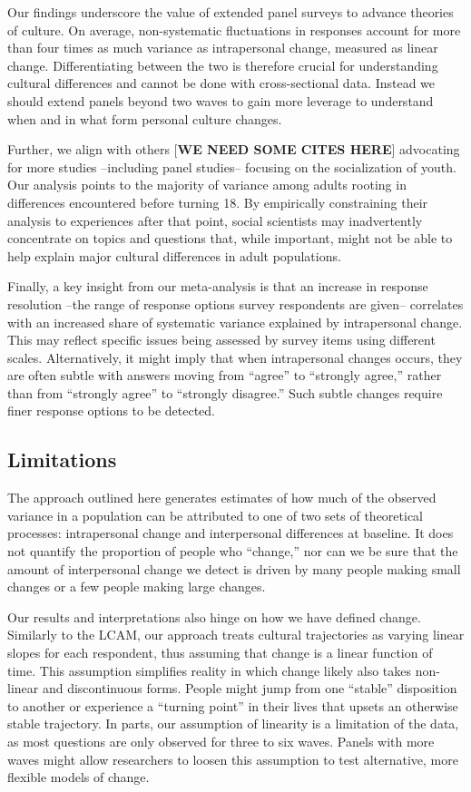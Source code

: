 \documentclass[
  12pt,
]{article}
\begin{document}
Our findings underscore the value of extended panel surveys to advance
theories of culture. On average, non-systematic fluctuations in
responses account for more than four times as much variance as
intrapersonal change, measured as linear change. Differentiating between
the two is therefore crucial for understanding cultural differences and
cannot be done with cross-sectional data. Instead we should extend
panels beyond two waves to gain more leverage to understand when and in
what form personal culture changes.

Further, we align with others {[}\textbf{WE NEED SOME CITES HERE}{]}
advocating for more studies --including panel studies-- focusing on the
socialization of youth. Our analysis points to the majority of variance
among adults rooting in differences encountered before turning 18. By
empirically constraining their analysis to experiences after that point,
social scientists may inadvertently concentrate on topics and questions
that, while important, might not be able to help explain major cultural
differences in adult populations.

Finally, a key insight from our meta-analysis is that an increase in
response resolution --the range of response options survey respondents
are given-- correlates with an increased share of systematic variance
explained by intrapersonal change. This may reflect specific issues
being assessed by survey items using different scales. Alternatively, it
might imply that when intrapersonal changes occurs, they are often
subtle with answers moving from ``agree'' to ``strongly agree,'' rather
than from ``strongly agree'' to ``strongly disagree.'' Such subtle
changes require finer response options to be detected.

\hypertarget{limitations}{%
\subsection{Limitations}\label{limitations}}

The approach outlined here generates estimates of how much of the
observed variance in a population can be attributed to one of two sets
of theoretical processes: intrapersonal change and interpersonal
differences at baseline. It does not quantify the proportion of people
who ``change,'' nor can we be sure that the amount of interpersonal
change we detect is driven by many people making small changes or a few
people making large changes.

Our results and interpretations also hinge on how we have defined
change. Similarly to the LCAM, our approach treats cultural trajectories
as varying linear slopes for each respondent, thus assuming that change
is a linear function of time. This assumption simplifies reality in
which change likely also takes non-linear and discontinuous forms.
People might jump from one ``stable'' disposition to another or
experience a ``turning point'' in their lives that upsets an otherwise
stable trajectory. In parts, our assumption of linearity is a limitation
of the data, as most questions are only observed for three to six waves.
Panels with more waves might allow researchers to loosen this assumption
to test alternative, more flexible models of change.
\end{document}
